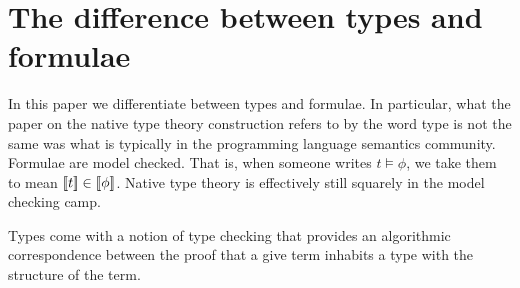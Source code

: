 \section{The difference between types and formulae}

In this paper we differentiate between types and formulae. In
particular, what the paper on the native type theory construction
refers to by the word type is not the same was what is typically in
the programming language semantics community. Formulae are model
checked. That is, when someone writes $t \models \phi$, we take them
to mean $[\![ t ]\!] \in [\![ \phi ]\!]$. Native type theory is
effectively still squarely in the model checking camp.

Types come with a notion of type checking that provides an algorithmic
correspondence between the proof that a give term inhabits a type with
the structure of the term.
